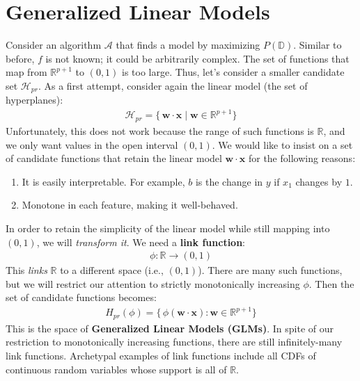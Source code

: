 \documentclass[12pt, a4paper]{article}
\theoremstyle{definition}
\begin{document}
	\section*{Generalized Linear Models}
	Consider an algorithm $\mathcal{A}$ that finds a model by maximizing $P(\mathbb{D})$.
	Similar to before, $f$ is not known; it could be arbitrarily complex. The set of functions
	that map from $\mathbb{R}^{p+1}$ to $(0,1)$ is too large. Thus, let's consider a smaller
	candidate set $\mathcal{H}_{pr}$. As a first attempt, consider again the linear model
	(the set of hyperplanes):
	\begin{align*}
		\mathcal{H}_{pr} = \{\, \bm{w}\cdot \bm{x} \mid \bm{w}\in\mathbb{R}^{p+1}\}
	\end{align*}
	Unfortunately, this does not work because the range of such functions is $\mathbb{R}$,
	and we only want values in the open interval $(0,1)$. We would like to insist on
	a set of candidate functions that retain the linear model $\bm{w}\cdot\bm{x}$
	for the following reasons:
	\begin{enumerate}[label=(\arabic*)]
		\item It is easily interpretable. For example, $b$ is the change in $y$
		if $x_1$ changes by $1$.
		\item Monotone in each feature, making it well-behaved.
	\end{enumerate}
	In order to retain the simplicity of the linear model while still mapping into $(0,1)$,
	we will \textit{transform it}. We need a \textbf{link function}:
	\begin{align*}
		\phi:\mathbb{R}\to (0, 1)
	\end{align*}
	This \textit{links} $\mathbb{R}$ to a different space (i.e., $(0,1)$). There are
	many such functions, but we will restrict our attention to strictly monotonically
	increasing $\phi$. Then the set of candidate functions becomes:
	\begin{align*}
		H_{pr}(\phi) = \{\, \phi(\bm{w}\cdot\bm{x}): \bm{w}\in\mathbb{R}^{p+1}\}
	\end{align*}
	This is the space of \textbf{Generalized Linear Models (GLMs)}. In spite of our
	restriction to monotonically increasing functions, there are still infinitely-many
	link functions. Archetypal examples of link functions include all CDFs of continuous
	random variables whose support is all of $\mathbb{R}$.
\end{document}
